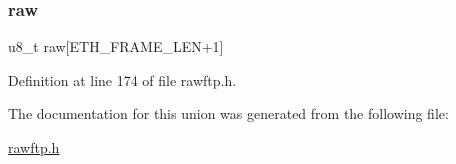\subsubsection{\texorpdfstring{raw}{raw}}
{\footnotesize\ttfamily u8\+\_\+t raw\mbox{[}E\+T\+H\+\_\+\+F\+R\+A\+M\+E\+\_\+\+L\+EN+1\mbox{]}}



Definition at line 174 of file rawftp.\+h.



The documentation for this union was generated from the following file\+:\begin{DoxyCompactItemize}
\item 
\hyperlink{rawftp_8h}{rawftp.\+h}\end{DoxyCompactItemize}

